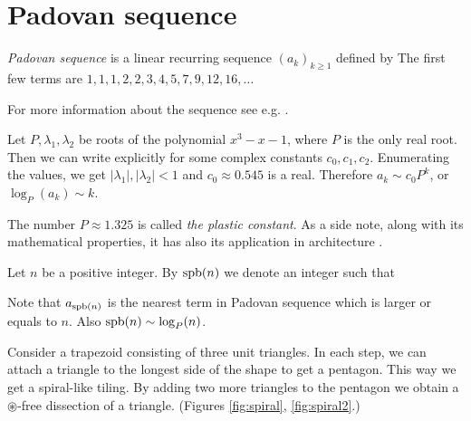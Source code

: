 \section{Padovan sequence}

\begin{defn}
\emph{Padovan sequence} is a linear recurring sequence $(a_k)_{k \geq 1}$ defined by
%
The first few terms are $1, 1, 1, 2, 2, 3, 4, 5, 7, 9, 12, 16,\dots$
\end{defn}

For more information about the sequence see e.g. \cite{OEIS}.

Let $P, \lambda_1, \lambda_2$ be roots of the polynomial $x^3-x-1$, where $P$ is the only real root. Then we can write explicitly
%
for some complex constants $c_0,c_1,c_2$. Enumerating the values, we get $|\lambda_1|, |\lambda_2| < 1$ and $c_0 \approx 0.545$ is a real. Therefore $a_k \sim c_0P^k$, or $\log_P(a_k) \sim k$.

The number $P \approx 1.325$ is called \emph{the plastic constant}. As a side note, along with its mathematical properties, it has also its application in architecture \cite{Stewart96}.

\begin{defn}
Let $n$ be a positive integer. By $\mathop{\mathrm{spb}}(n)$ we denote an integer such that
\end{defn}

Note that $a_{\mathop{\mathrm{spb}}(n)}$ is the nearest term in Padovan sequence which is larger or equals to $n$. Also $\mathop{\mathrm{spb}}(n) \sim \log_P(n)$.

Consider a trapezoid consisting of three unit triangles. In each step, we can attach a triangle to the longest side of the shape to get a pentagon. This way we get a spiral-like tiling. By adding two more triangles to the pentagon we obtain a $\circledast$-free dissection of a triangle. (Figures \ref{fig:spiral}, \ref{fig:spiral2}.)

